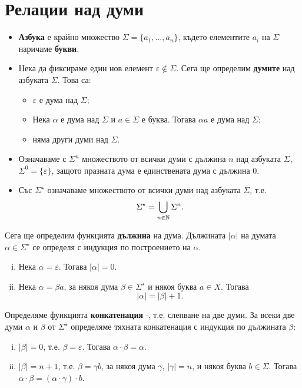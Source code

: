 \section{Релации над думи}
\begin{itemize}
\item
  {\bf Азбука} е крайно множество $\Sigma = \{a_1,\dots,a_n\}$, където елементите $a_i$ на $\Sigma$ наричаме {\bf букви}.
\item
  Нека да фиксираме един нов елемент $\varepsilon \not\in \Sigma$.
  Сега ще определим {\bf думите} над азбуката $\Sigma$. Това са:
  \begin{itemize}
  \item
    $\varepsilon$ е дума над $\Sigma$;
  \item
    Нека $\alpha$ е дума над $\Sigma$ и $a \in \Sigma$ е буква.
    Тогава $\alpha a$ е дума над $\Sigma$;
  \item
    няма други думи над $\Sigma$.
  \end{itemize}
\item
  Означаваме с $\Sigma^n$ множеството от всички думи с дължина $n$ над азбуката $\Sigma$, $\Sigma^0 = \{\varepsilon\}$,
  защото празната дума е единствената дума с дължина $0$.
\item
  Със $\Sigma^\star$ означаваме множеството от всички думи над азбуката $\Sigma$, т.е.
  \marginpar{$0 \in \Nat$}
  \[\Sigma^\star = \bigcup_{n\in\mathbb{N}} \Sigma^{n}.\]
\end{itemize}

Сега ще определим функцията {\bf дължина} на дума.
Дължината $|\alpha|$ на думата $\alpha \in \Sigma^\star$ се определя с индукция по построението на $\alpha$.
\begin{enumerate}[(i)]
  \item
    Нека $\alpha = \varepsilon$. Тогава $|\alpha| = 0$.
  \item
    Нека $\alpha = \beta a$, за някоя дума $\beta\in \Sigma^\star$ и някоя буква $a\in X$.
    Тогава \[|\alpha| = |\beta| + 1.\]
\end{enumerate}

Определяме функцията {\bf конкатенация} $\cdot$, т.е.
слепване на две думи.
За всеки две думи $\alpha$ и $\beta$ от $\Sigma^\star$ определяме тяхната конкатенация с индукция по дължината $\beta$:
\begin{enumerate}[(i)]
  \item
    $|\beta| = 0$, т.е. $\beta = \varepsilon$.
    Тогава $\alpha\cdot\beta = \alpha$.
  \item
    $|\beta| = n+1$, т.е. $\beta = \gamma b$, за някоя дума $\gamma$, $|\gamma| = n$, и някоя буква $b\in\Sigma$.
    Тогава $\alpha\cdot\beta = (\alpha\cdot\gamma)\cdot b$.
\end{enumerate}

